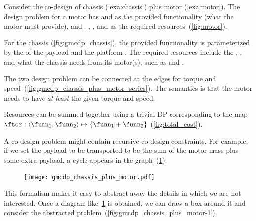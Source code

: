 \begin{example}
\label{exa:chassis_plus_motor}Consider the co-design of chassis (\cref{exa:chassis})
plus motor (\cref{exa:motor}). The design problem for a motor has 
and  as the provided functionality (what the motor must
provide), and , , , and 
as the required resources~(\cref{fig:motor}).


\noindent For the chassis (\cref{fig:gmcdp_chassis}), the provided
functionality is parameterized by the  of the payload and
the platform . The required resources include the ,
, and what the chassis needs from its motor(s), such
as  and .


\noindent The two design problem can be connected at the edges for
torque and speed~(\cref{fig:gmcdp_chassis_plus_motor_series}). The
semantics is that the motor needs to have\emph{ at least }the given
torque and speed. 


\noindent Resources can be summed together using a trivial DP corresponding
to the map $\ftor:\left\langle \funn_{1},\funn_{2}\right\rangle \mapsto\{\funn_{1}+\funn_{2}\}$
(\cref{fig:total_cost}).


\noindent A co-design problem might contain recursive co-design constraints.
For example, if we set the payload to be transported to be the sum
of the motor mass plus some extra payload, a cycle appears in the
graph~(\cref{fig:gmcdp_chassis_plus_motor}). 

\noindent 
\begin{figure}[h]
\centering{}\texttt{[image: gmcdp\_chassis\_plus\_motor.pdf]}\caption{\label{fig:gmcdp_chassis_plus_motor}}
\end{figure}

\noindent This formalism makes it easy to abstract away the details
in which we are not interested. Once a diagram like~\cref{fig:gmcdp_chassis_plus_motor}
is obtained, we can draw a box around it and consider the abstracted
problem~(\cref{fig:gmcdp_chassis_plus_motor-1}). 


\end{example}

